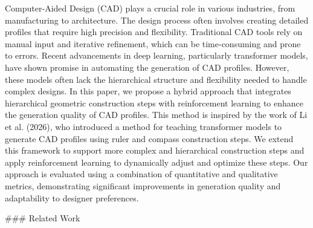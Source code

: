 Computer-Aided Design (CAD) plays a crucial role in various industries, from manufacturing to architecture. The design process often involves creating detailed profiles that require high precision and flexibility. Traditional CAD tools rely on manual input and iterative refinement, which can be time-consuming and prone to errors. Recent advancements in deep learning, particularly transformer models, have shown promise in automating the generation of CAD profiles. However, these models often lack the hierarchical structure and flexibility needed to handle complex designs. In this paper, we propose a hybrid approach that integrates hierarchical geometric construction steps with reinforcement learning to enhance the generation quality of CAD profiles. This method is inspired by the work of Li et al. (2026), who introduced a method for teaching transformer models to generate CAD profiles using ruler and compass construction steps. We extend this framework to support more complex and hierarchical construction steps and apply reinforcement learning to dynamically adjust and optimize these steps. Our approach is evaluated using a combination of quantitative and qualitative metrics, demonstrating significant improvements in generation quality and adaptability to designer preferences.

### Related Work


